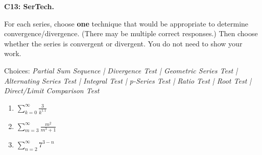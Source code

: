 \documentclass[12pt]{article}
\newcommand{\<}{\left\langle}
\renewcommand{\>}{\right\rangle}
\newcommand{\exerciseHeader}[4]{


  \vspace{0.5em}
  \textbf{#2}
  \vspace{0.5em}

}
\begin{document}
\begin{multicols}{2}
%
%
%
%
%
%

\columnbreak

\exerciseHeader{2017 July 21}{C13: SerTech.}{
Identify series as convergent or divergent along with appropriate techniques to
determine convergence or divergence.
}{4/4}

For each series, choose \textbf{one} technique that
would be appropriate to determine convergence/divergence. (There may be
multiple correct responses.) Then choose
whether the series is convergent or divergent. You do not need to show your
work.

Choices: \textit{Partial Sum Sequence |
 Divergence Test |
 Geometric Series Test |
 Alternating Series Test |
 Integral Test |
 p-Series Test |
 Ratio Test |
 Root Test |
 Direct/Limit Comparison Test}

\begin{enumerate}
  \item \(\sum_{k=0}^\infty\frac{3}{k^{1.1}}\)
  \item \(\sum_{m=3}^\infty\frac{m^2}{m^3+1}\)
  \item \(\sum_{n=2}^\infty 7^{3-n}\)
\end{enumerate}


\columnbreak




\end{multicols}
\end{document}
